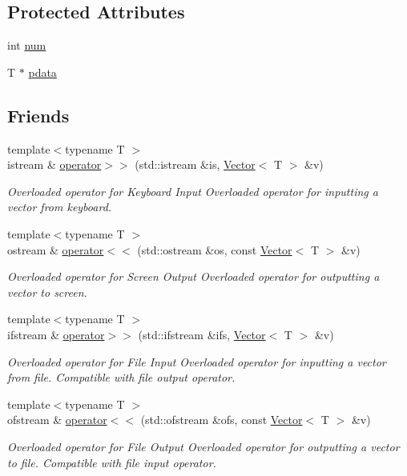 \subsection*{Protected Attributes}
\begin{DoxyCompactItemize}
\item 
int \hyperlink{class_vector_ab22f5c6b6b9110d18705354e62a8e0e6}{num}
\item 
T $\ast$ \hyperlink{class_vector_a2eb967804ab083f77c2a8238cc060498}{pdata}
\end{DoxyCompactItemize}
\subsection*{Friends}
\begin{DoxyCompactItemize}
\item 
{\footnotesize template$<$typename T $>$ }\\istream \& \hyperlink{class_vector_a40dfb1e5107cd90a2c58148c04a93a31}{operator$>$$>$} (std\-::istream \&is, \hyperlink{class_vector}{Vector}$<$ T $>$ \&v)
\begin{DoxyCompactList}\small\item\em Overloaded operator for Keyboard Input Overloaded operator for inputting a vector from keyboard. \end{DoxyCompactList}\item 
{\footnotesize template$<$typename T $>$ }\\ostream \& \hyperlink{class_vector_a9652526bb52b8da281d59cc3b24a6f4f}{operator$<$$<$} (std\-::ostream \&os, const \hyperlink{class_vector}{Vector}$<$ T $>$ \&v)
\begin{DoxyCompactList}\small\item\em Overloaded operator for Screen Output Overloaded operator for outputting a vector to screen. \end{DoxyCompactList}\item 
{\footnotesize template$<$typename T $>$ }\\ifstream \& \hyperlink{class_vector_a8922a7c744791b0022a7c0b8f35e9643}{operator$>$$>$} (std\-::ifstream \&ifs, \hyperlink{class_vector}{Vector}$<$ T $>$ \&v)
\begin{DoxyCompactList}\small\item\em Overloaded operator for File Input Overloaded operator for inputting a vector from file. Compatible with file output operator. \end{DoxyCompactList}\item 
{\footnotesize template$<$typename T $>$ }\\ofstream \& \hyperlink{class_vector_a8f5c4cd0623b497b39f9cc1c5fa904f3}{operator$<$$<$} (std\-::ofstream \&ofs, const \hyperlink{class_vector}{Vector}$<$ T $>$ \&v)
\begin{DoxyCompactList}\small\item\em Overloaded operator for File Output Overloaded operator for outputting a vector to file. Compatible with file input operator. \end{DoxyCompactList}\end{DoxyCompactItemize}


